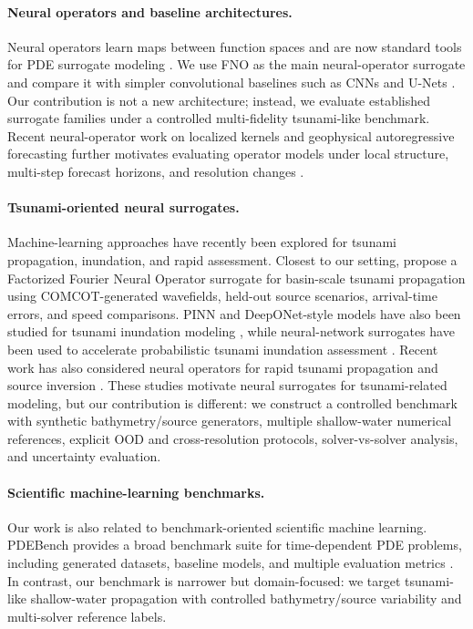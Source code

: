 \paragraph{Neural operators and baseline architectures.}
Neural operators learn maps between function spaces and are now standard tools for PDE surrogate modeling \citep{li2021fno,kovachki2023neuraloperator}. We use FNO as the main neural-operator surrogate and compare it with simpler convolutional baselines such as CNNs and U-Nets \citep{lecun1998gradient,ronneberger2015unet}. Our contribution is not a new architecture; instead, we evaluate established surrogate families under a controlled multi-fidelity tsunami-like benchmark. Recent neural-operator work on localized kernels and geophysical autoregressive forecasting further motivates evaluating operator models under local structure, multi-step forecast horizons, and resolution changes \citep{liu2024localized,pathak2022fourcastnet,hu2025spherical}.

\paragraph{Tsunami-oriented neural surrogates.}
Machine-learning approaches have recently been explored for tsunami propagation, inundation, and rapid assessment. Closest to our setting, \citet{kim2026ffno_tsunami} propose a Factorized Fourier Neural Operator surrogate for basin-scale tsunami propagation using COMCOT-generated wavefields, held-out source scenarios, arrival-time errors, and speed comparisons. PINN and DeepONet-style models have also been studied for tsunami inundation modeling \citep{brecht2025pinn_tsunami}, while neural-network surrogates have been used to accelerate probabilistic tsunami inundation assessment \citep{fukutani2025prob_tsunami}. Recent work has also considered neural operators for rapid tsunami propagation and source inversion \citep{someya2026tsunamiNO}. These studies motivate neural surrogates for tsunami-related modeling, but our contribution is different: we construct a controlled benchmark with synthetic bathymetry/source generators, multiple shallow-water numerical references, explicit OOD and cross-resolution protocols, solver-vs-solver analysis, and uncertainty evaluation.

\paragraph{Scientific machine-learning benchmarks.}
Our work is also related to benchmark-oriented scientific machine learning. PDEBench provides a broad benchmark suite for time-dependent PDE problems, including generated datasets, baseline models, and multiple evaluation metrics \citep{takamoto2022pdebench}. In contrast, our benchmark is narrower but domain-focused: we target tsunami-like shallow-water propagation with controlled bathymetry/source variability and multi-solver reference labels.

